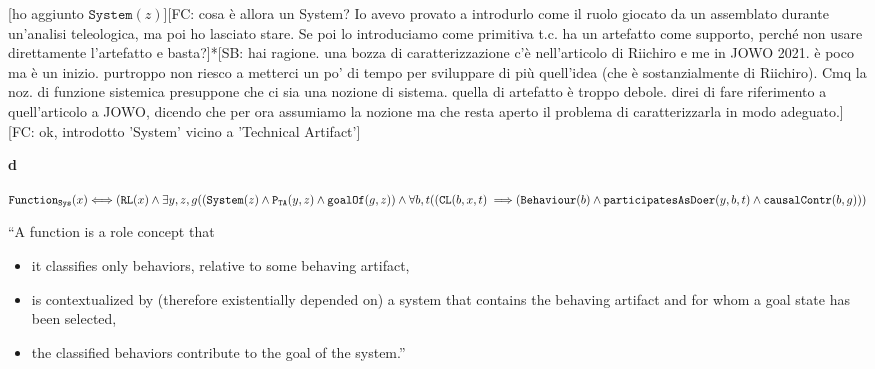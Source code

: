 \documentclass[sw]{iosart2x}
\newcommand{\bflist}{\begin{list}{}{\setlength{\topsep}{2mm}\setlength{\partopsep}{0mm}\setlength{\parsep}{0mm}\setlength{\leftmargin}{9mm}\setlength{\labelwidth}{8mm}}}
\newcommand{\eflist}{\end{list}}
\newcommand{\DefLabel}{\textrm{d}}
\newcounter{cntdef}
\newcommand{\mydf}[1]{\refstepcounter{cntdef}\begin{small}{\bf \DefLabel\thecntdef\label{def:#1}}\end{small}}
\newcommand{\generalStyle}[1]{\texttt{#1}}
\newcommand{\biRel}[3]{\generalStyle{#1}(#2,#3)}
\newcommand{\uniRel}[2]{\generalStyle{#1}(#2)}
\newcommand{\uniRelPar}[3]{\generalStyle{#1}_{\generalStyle{#3}}(#2)}
\newcommand{\biRelPar}[4]{\generalStyle{#1}_{\generalStyle{#4}}(#2,#3)}
\newcommand{\triRel}[4]{\generalStyle{#1}(#2,#3,#4)}
\newcommand{\myiff}{\Longleftrightarrow}
\newcommand{\myfi}{\hspace{0.9mm} \Longrightarrow}
\newcommand{\DOLCERole}[1]{\uniRel{{RL}}{#1}}
\newcommand{\DOLCEPart}[2]{\biRel{{P}}{#1}{#2}}
\newcommand{\DOLCECLby}[3]{\triRel{CL}{#1}{#2}{#3}}
\newcommand{\BehaviourConcrete}[1]{\uniRel{Behaviour}{#1}}
\newcommand{\System}[1]{\uniRel{System}{#1}}
\newcommand{\FunctionSys}[1]{\uniRelPar{Function}{#1}{Sys}}
\newcommand{\contextOf}[2]{\biRel{contextOf}{#1}{#2}}
\newcommand{\causallyContr}[2]{\biRel{causalContr}{#1}{#2}}
\newcommand{\participateAsDoer}[3]{\triRel{participatesAsDoer}{#1}{#2}{#3}}
\newcommand{\goalOf}[2]{\biRel{goalOf}{#1}{#2}}
\newcommand{\partTA}[2]{\biRelPar{P}{#1}{#2}{TA}}
\newcommand{\TODO}[1]{{\color{red} #1}}
\begin{document}
\TODO{[ho aggiunto $\System{z}$][FC: cosa è allora un System? Io avevo provato a introdurlo come il ruolo giocato da un assemblato durante un'analisi teleologica, ma poi ho lasciato stare. Se poi lo introduciamo come primitiva t.c. ha un artefatto come supporto, perché non usare direttamente l'artefatto e basta?]*[SB: hai ragione. una bozza di caratterizzazione c'è nell'articolo di Riichiro e me in JOWO 2021. è poco ma è un inizio. purtroppo non riesco a metterci un po' di tempo per sviluppare di più quell'idea (che è sostanzialmente di Riichiro). Cmq la noz. di funzione sistemica presuppone che ci sia una nozione di sistema. quella di artefatto è troppo debole. direi di fare riferimento a quell'articolo a JOWO, dicendo che per ora assumiamo la nozione ma che resta aperto il problema di caratterizzarla in modo adeguato.][FC: ok, introdotto 'System' vicino a 'Technical Artifact']}
\bflist
  


  \item[\mydf{function}] $ \FunctionSys{x} \myiff (\DOLCERole{x} \land 
  \exists y,z,g ((\System{z} \land \partTA{y}{z} \land \goalOf{g}{z}) \land \\
    \forall b,t ((\DOLCECLby{b}{x}{t} \myfi (\BehaviourConcrete{b} \land 
      \participateAsDoer{y}{b}{t} \land \causallyContr{b}{g}))  $
  \item [] {``A function is a role concept that 
  \begin{itemize}[topsep=0pt]
    \item it classifies only behaviors, relative to some behaving artifact, 
    \item is contextualized by (therefore existentially depended on) a system that contains the behaving artifact and for whom a goal state has been selected, 
    \item the classified behaviors contribute to the goal of the system.'' %
  \end{itemize}}
\eflist
\end{document}
